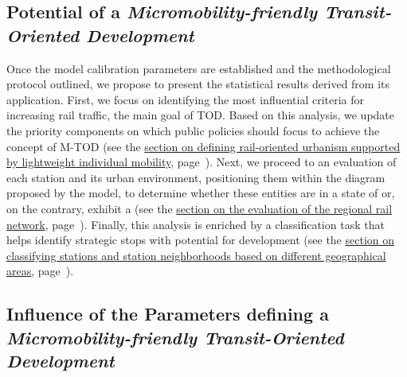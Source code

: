 \begin{refsegment}
    \newpage
\section{Potential of a \textsl{Micromobility-friendly Transit-Oriented Development}
    \label{chap6:resultats-modele}
    }

Once the model calibration parameters are established and the methodological protocol outlined, we propose to present the statistical results derived from its application. First, we focus on identifying the most influential criteria for increasing rail traffic, the main goal of \acrshort{TOD}. Based on this analysis, we update the priority components on which public policies should focus to achieve the concept of \acrshort{M-TOD} (see the \hyperref[chap6:results-influence-indicateurs]{section on defining rail-oriented urbanism supported by lightweight individual mobility}, page~\pageref{chap6:results-influence-indicateurs}). Next, we proceed to an evaluation of each station and its urban environment, positioning them within the diagram proposed by the model, to determine whether these entities are in a state of  or, on the contrary, exhibit a  (see the \hyperref[chap6:results-caracterisation-gares]{section on the evaluation of the regional rail network}, page~\pageref{chap6:results-caracterisation-gares}). Finally, this analysis is enriched by a classification task that helps identify strategic stops with potential for development (see the \hyperref[chap6:results-classification-gares]{section on classifying stations and station neighborhoods based on different geographical areas}, page~\pageref{chap6:results-classification-gares}).%

\subsection{Influence of the Parameters defining a \textsl{Micromobility-friendly Transit-Oriented Development}
    \label{chap6:results-influence-indicateurs}
    }


\end{refsegment}
